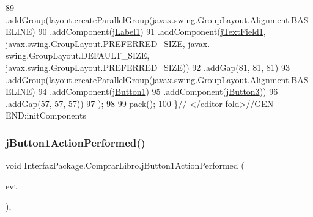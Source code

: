 \begin{DoxyCode}
89                 .addGroup(layout.createParallelGroup(javax.swing.GroupLayout.Alignment.BASELINE)
90                     .addComponent(\mbox{\hyperlink{class_interfaz_package_1_1_comprar_libro_a6f76d43eea40102ddff5d882389f306e}{jLabel1}})
91                     .addComponent(\mbox{\hyperlink{class_interfaz_package_1_1_comprar_libro_aefb13deeb30da3f6668b192b74c20705}{jTextField1}}, javax.swing.GroupLayout.PREFERRED\_SIZE, javax.
      swing.GroupLayout.DEFAULT\_SIZE, javax.swing.GroupLayout.PREFERRED\_SIZE))
92                 .addGap(81, 81, 81)
93                 .addGroup(layout.createParallelGroup(javax.swing.GroupLayout.Alignment.BASELINE)
94                     .addComponent(\mbox{\hyperlink{class_interfaz_package_1_1_comprar_libro_add5c058f4090954bd33f186540441d18}{jButton1}})
95                     .addComponent(\mbox{\hyperlink{class_interfaz_package_1_1_comprar_libro_a911d2c0fd76d0d219563ebd3ddc851b0}{jButton3}}))
96                 .addGap(57, 57, 57))
97         );
98 
99         pack();
100     \}\textcolor{comment}{// </editor-fold>//GEN-END:initComponents}
\end{DoxyCode}
\mbox{\label{class_interfaz_package_1_1_comprar_libro_aebce4e6cc2e6631bb667ecf27132414a}} 
\subsubsection{\texorpdfstring{j\+Button1\+Action\+Performed()}{jButton1ActionPerformed()}}
{\footnotesize\ttfamily void Interfaz\+Package.\+Comprar\+Libro.\+j\+Button1\+Action\+Performed (\begin{DoxyParamCaption}\item[{java.\+awt.\+event.\+Action\+Event}]{evt }\end{DoxyParamCaption})\hspace{0.3cm}{\ttfamily [inline]}, {\ttfamily [private]}}


